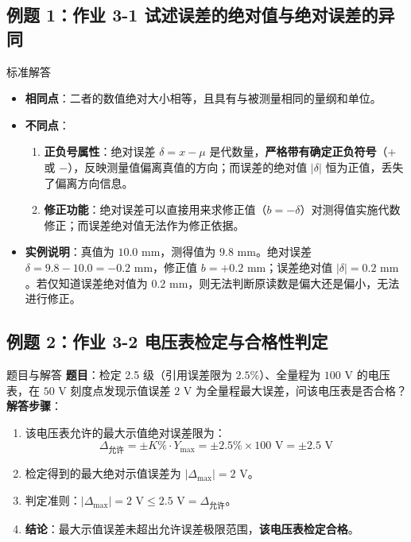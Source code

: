 \documentclass[11pt,a4paper]{ctexart}
\begin{document}
\subsection{例题 1：作业 3-1 试述误差的绝对值与绝对误差的异同}
\begin{solbox}{标准解答}
\begin{itemize}
    \item \textbf{相同点}：二者的数值绝对大小相等，且具有与被测量相同的量纲和单位。
    \item \textbf{不同点}：
    \begin{enumerate}
        \item \textbf{正负号属性}：绝对误差 $\delta = x - \mu$ 是代数量，\textbf{严格带有确定正负符号}（$+$ 或 $-$），反映测量值偏离真值的方向；而误差的绝对值 $|\delta|$ 恒为正值，丢失了偏离方向信息。
        \item \textbf{修正功能}：绝对误差可以直接用来求修正值（$b = -\delta$）对测得值实施代数修正；而误差绝对值无法作为修正依据。
    \end{enumerate}
    \item \textbf{实例说明}：真值为 $10.0\text{ mm}$，测得值为 $9.8\text{ mm}$。绝对误差 $\delta = 9.8 - 10.0 = -0.2\text{ mm}$，修正值 $b = +0.2\text{ mm}$；误差绝对值 $|\delta| = 0.2\text{ mm}$。若仅知道误差绝对值为 $0.2\text{ mm}$，则无法判断原读数是偏大还是偏小，无法进行修正。
\end{itemize}
\end{solbox}

\subsection{例题 2：作业 3-2 电压表检定与合格性判定}
\begin{solbox}{题目与解答}
\textbf{题目}：检定 2.5 级（引用误差限为 $2.5\%$）、全量程为 $100\text{ V}$ 的电压表，在 $50\text{ V}$ 刻度点发现示值误差 $2\text{ V}$ 为全量程最大误差，问该电压表是否合格？\\[0.5em]
\textbf{解答步骤}：
\begin{enumerate}
    \item 该电压表允许的最大示值绝对误差限为：
    $$\Delta_{\text{允许}} = \pm K\% \cdot Y_{\max} = \pm 2.5\% \times 100\text{ V} = \pm 2.5\text{ V}$$
    \item 检定得到的最大绝对示值误差为 $|\Delta_{\max}| = 2\text{ V}$。
    \item 判定准则：$|\Delta_{\max}| = 2\text{ V} \le 2.5\text{ V} = \Delta_{\text{允许}}$。
    \item \textbf{结论}：最大示值误差未超出允许误差极限范围，\textbf{该电压表检定合格}。
\end{enumerate}
\end{solbox}
\end{document}
